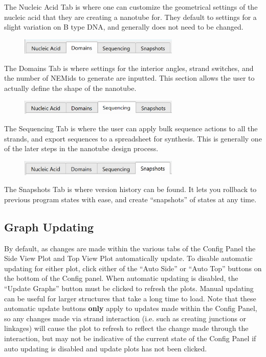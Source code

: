 \documentclass[titlepage]{article}
\begin{document}
The Nucleic Acid Tab is where one can customize the geometrical settings of the nucleic acid that they are creating a nanotube for. They default to settings for a slight variation on B type DNA, and generally does not need to be changed. 

\begin{figure}[H] \label{fig:domains-tab-activated}
	\centering
	\includegraphics[width=3in]{"domains-tab-activated.png"}
\end{figure}

The Domains Tab is where settings for the interior angles, strand switches, and the number of NEMids to generate are inputted. This section allows the user to actually define the shape of the nanotube.

\begin{figure}[H] \label{fig:sequencing-activated}
	\centering
	\includegraphics[width=3in]{"sequencing-tab-activated.png"}
\end{figure}

The Sequencing Tab is where the user can apply bulk sequence actions to all the strands, and export sequences to a spreadsheet for synthesis. This is generally one of the later steps in the nanotube design process.

\begin{figure}[H] \label{fig:snapshots-activated}
	\centering
	\includegraphics[width=3in]{"snapshots-tab-activated.png"}
\end{figure}

The Snapshots Tab is where version history can be found. It lets you rollback to previous program states with ease, and create ``snapshots'' of states at any time.

\subsection{Graph Updating}

By default, as changes are made within the various tabs of the Config Panel the Side View Plot and Top View Plot automatically update. To disable automatic updating for either plot, click either of the ``Auto Side'' or ``Auto Top'' buttons on the bottom of the Config panel. When automatic updating is disabled, the ``Update Graphs'' button must be clicked to refresh the plots. Manual updating can be useful for larger structures that take a long time to load. Note that these automatic update buttons \textbf{only} apply to updates made within the Config Panel, so any changes made via strand interaction (i.e. such as creating junctions or linkages) will cause the plot to refresh to reflect the change made through the interaction, but may not be indicative of the current state of the Config Panel if auto updating is disabled and update plots has not been clicked.
\end{document}
